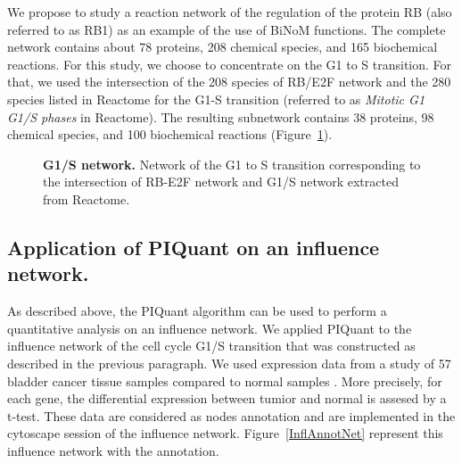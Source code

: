 \documentclass[10pt]{bmc_article}
\newenvironment{bmcformat}{\baselineskip20pt\sloppy\setboolean{publ}{false}}{\baselineskip20pt\sloppy}
\begin{document}
\begin{bmcformat}
%
%
% 

We propose to study a reaction network of the regulation of the protein RB (also
referred to as RB1) \cite{calzone2008comprehensive} as an example of the use of
BiNoM functions. The complete network contains about 78 proteins, 208 chemical
species, and 165 biochemical reactions. For this study, we choose to concentrate
on the G1 to S transition. For that, we used the intersection of the 208 species
of RB/E2F network and the 280 species listed in Reactome for the G1-S transition
(referred to as \emph{Mitotic G1 G1/S phases} in Reactome). The resulting
subnetwork contains 38 proteins, 98 chemical species, and 100 biochemical
reactions (Figure~\ref{g1s}).

%
%

\begin{figure}[h]
 \caption{\label{g1s}  \textbf{G1/S network.}
	Network of the G1 to S transition corresponding to the intersection of
RB-E2F network and G1/S network extracted from Reactome.}
\end{figure}


\subsection*{Application of PIQuant on an influence network.}
As described above, the PIQuant algorithm can be used to perform a quantitative
analysis on an influence network. We applied PIQuant to the influence network of
the cell cycle G1/S transition that was constructed as described in the
previous paragraph. We used expression data from a study of 57 bladder cancer
tissue samples compared to normal samples \cite{stransky2006regional}. More
precisely, for each gene, the differential expression between tumior and normal
is assesed by a t-test. These data are considered as nodes annotation and are
implemented in the cytoscape session of the influence network.
Figure~\ref{InflAnnotNet} represent this influence network with the annotation.
 


\end{bmcformat}
\end{document}
